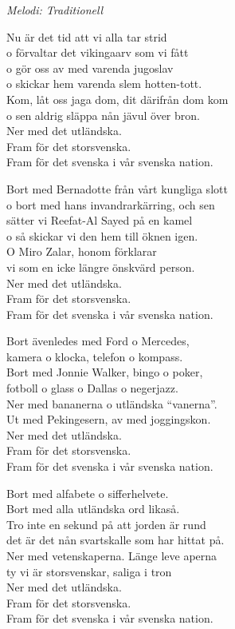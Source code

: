 {\footnotesize\textit{Melodi: Traditionell}}\par
\vspace{10pt}
Nu är det tid att vi alla tar strid\\
o förvaltar det vikingaarv som vi fått\\
o gör oss av med varenda jugoslav\\
o skickar hem varenda slem hotten-tott.\\
Kom, låt oss jaga dom, dit därifrån dom kom\\
o sen aldrig släppa nån jävul över bron.\\
Ner med det utländska.\\
Fram för det storsvenska.\\
Fram för det svenska i vår svenska nation. \par
\vspace{10pt}
Bort med Bernadotte från vårt kungliga slott\\
o bort med hans invandrarkärring, och sen\\
sätter vi Reefat-Al Sayed på en kamel\\
o så skickar vi den hem till öknen igen.\\
O Miro Zalar, honom förklarar\\
vi som en icke längre önskvärd person.\\
Ner med det utländska.\\
Fram för det storsvenska.\\
Fram för det svenska i vår svenska nation. \par
\vspace{10pt}
Bort ävenledes med Ford o Mercedes,\\
kamera o klocka, telefon o kompass.\\
Bort med Jonnie Walker, bingo o poker,\\
fotboll o glass o Dallas o negerjazz.\\
Ner med bananerna o utländska ``vanerna''.\\
Ut med Pekingesern, av med joggingskon.\\
Ner med det utländska.\\
Fram för det storsvenska.\\
Fram för det svenska i vår svenska nation. \par
\vspace{10pt}
Bort med alfabete o sifferhelvete.\\
Bort med alla utländska ord likaså.\\
Tro inte en sekund på att jorden är rund\\
det är det nån svartskalle som har hittat på.\\
Ner med vetenskaperna. Länge leve aperna\\
ty vi är storsvenskar, saliga i tron\\
Ner med det utländska.\\
Fram för det storsvenska.\\
Fram för det svenska i vår svenska nation. 
